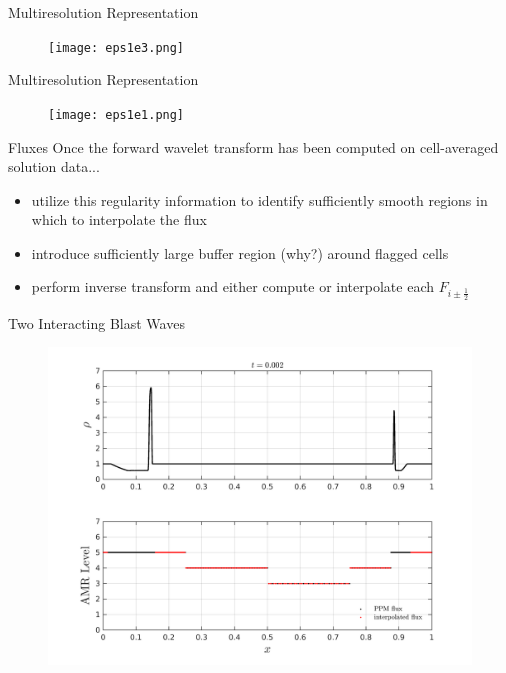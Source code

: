 \documentclass{beamer}
\begin{document}
\begin{frame}{Multiresolution Representation}
    \begin{figure}
        \center
        \texttt{[image: eps1e3.png]}
    \end{figure}
\end{frame}

\begin{frame}{Multiresolution Representation}
    \begin{figure}
        \center
        \texttt{[image: eps1e1.png]}
    \end{figure}
\end{frame}

\begin{frame}{Fluxes}
    Once the forward wavelet transform has been computed on cell-averaged solution data...
    \begin{itemize}
        \item<2-> utilize this regularity information to identify sufficiently smooth regions
            in which to interpolate the flux
        \item<3-> introduce sufficiently large buffer region (why?) around flagged cells
        \item<4-> perform inverse transform and either compute or interpolate each $F_{i\pm \frac{1}{2}}$
    \end{itemize}
\end{frame}

\begin{frame}{Two Interacting Blast Waves}
  \begin{figure}
    \center
    \includegraphics[scale=0.4]{blast2_early.png}
  \end{figure}
\end{frame}
\end{document}
